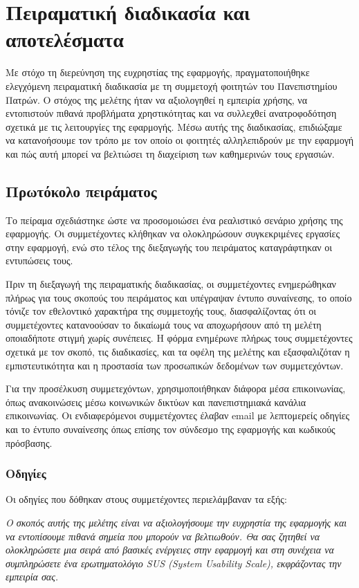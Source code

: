 \chapter{Πειραματική διαδικασία και αποτελέσματα}
    Με στόχο τη διερεύνηση της ευχρηστίας της εφαρμογής, πραγματοποιήθηκε ελεγχόμενη πειραματική διαδικασία με τη συμμετοχή φοιτητών του Πανεπιστημίου Πατρών. Ο στόχος της μελέτης ήταν να αξιολογηθεί η εμπειρία χρήσης, να εντοπιστούν πιθανά προβλήματα χρηστικότητας και να συλλεχθεί ανατροφοδότηση σχετικά με τις λειτουργίες της εφαρμογής. Μέσω αυτής της διαδικασίας, επιδιώξαμε να κατανοήσουμε τον τρόπο με τον οποίο οι φοιτητές αλληλεπιδρούν με την εφαρμογή και πώς αυτή μπορεί να βελτιώσει τη διαχείριση των καθημερινών τους εργασιών.

    \section{Πρωτόκολο πειράματος}
        Το πείραμα σχεδιάστηκε ώστε να προσομοιώσει ένα ρεαλιστικό σενάριο χρήσης της εφαρμογής. Οι συμμετέχοντες κλήθηκαν να ολοκληρώσουν συγκεκριμένες εργασίες στην εφαρμογή, ενώ στο τέλος της διεξαγωγής του πειράματος καταγράφτηκαν οι εντυπώσεις τους.

        Πριν τη διεξαγωγή της πειραματικής διαδικασίας, οι συμμετέχοντες ενημερώθηκαν πλήρως για τους σκοπούς του πειράματος και υπέγραψαν έντυπο συναίνεσης, το οποίο τόνιζε τον εθελοντικό χαρακτήρα της συμμετοχής τους, διασφαλίζοντας ότι οι συμμετέχοντες κατανοούσαν το δικαίωμά τους να αποχωρήσουν από τη μελέτη οποιαδήποτε στιγμή χωρίς συνέπειες. Η φόρμα ενημέρωνε πλήρως τους συμμετέχοντες σχετικά με τον σκοπό, τις διαδικασίες, και τα οφέλη της μελέτης και εξασφαλιζόταν η εμπιστευτικότητα και η προστασία των προσωπικών δεδομένων των συμμετεχόντων.

        Για την προσέλκυση συμμετεχόντων, χρησιμοποιήθηκαν διάφορα μέσα επικοινωνίας, όπως ανακοινώσεις μέσω κοινωνικών δικτύων και πανεπιστημιακά κανάλια επικοινωνίας. Οι ενδιαφερόμενοι συμμετέχοντες έλαβαν email με λεπτομερείς οδηγίες και το έντυπο συναίνεσης όπως επίσης τον σύνδεσμο της εφαρμογής και κωδικούς πρόσβασης.

        \subsection{Οδηγίες}
            Οι οδηγίες που δόθηκαν στους συμμετέχοντες περιελάμβαναν τα εξής:

            \textit{Ο σκοπός αυτής της μελέτης είναι να αξιολογήσουμε την ευχρηστία της εφαρμογής και να εντοπίσουμε πιθανά σημεία που μπορούν να βελτιωθούν. Θα σας ζητηθεί να ολοκληρώσετε μια σειρά από βασικές ενέργειες στην εφαρμογή και στη συνέχεια να συμπληρώσετε ένα ερωτηματολόγιο SUS (System Usability Scale), εκφράζοντας την εμπειρία σας.}

